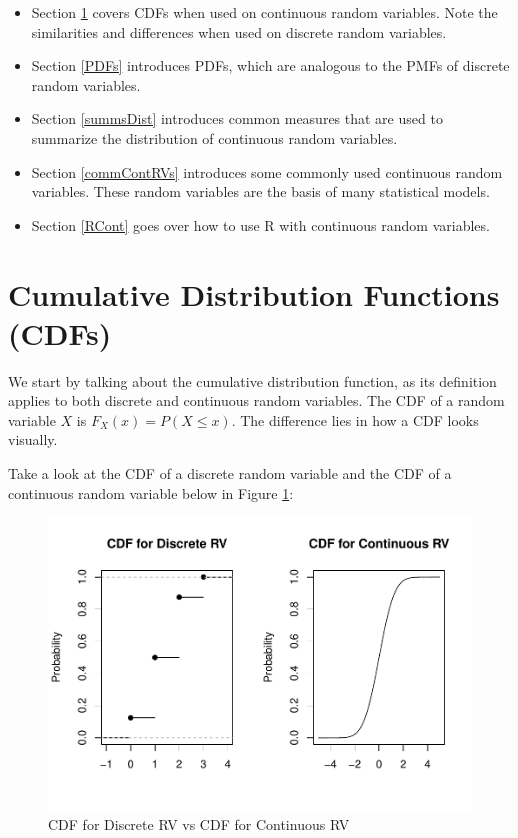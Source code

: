 \documentclass[
]{book}
\providecommand{\tightlist}{%
  \setlength{\itemsep}{0pt}\setlength{\parskip}{0pt}}
\begin{document}
\begin{itemize}
\tightlist
\item
  Section \ref{contCDFs} covers CDFs when used on continuous random variables. Note the similarities and differences when used on discrete random variables.
\item
  Section \ref{PDFs} introduces PDFs, which are analogous to the PMFs of discrete random variables.
\item
  Section \ref{summsDist} introduces common measures that are used to summarize the distribution of continuous random variables.
\item
  Section \ref{commContRVs} introduces some commonly used continuous random variables. These random variables are the basis of many statistical models.
\item
  Section \ref{RCont} goes over how to use R with continuous random variables.
\end{itemize}

\hypertarget{contCDFs}{%
\section{Cumulative Distribution Functions (CDFs)}\label{contCDFs}}

We start by talking about the cumulative distribution function, as its definition applies to both discrete and continuous random variables. The CDF of a random variable \(X\) is \(F_X(x) = P(X \leq x)\). The difference lies in how a CDF looks visually.

Take a look at the CDF of a discrete random variable and the CDF of a continuous random variable below in Figure \ref{fig:4-compare}:

\begin{figure}
\centering
\includegraphics{bookdown-demo_files/figure-latex/4-compare-1.pdf}
\caption{\label{fig:4-compare}CDF for Discrete RV vs CDF for Continuous RV}
\end{figure}
\end{document}
